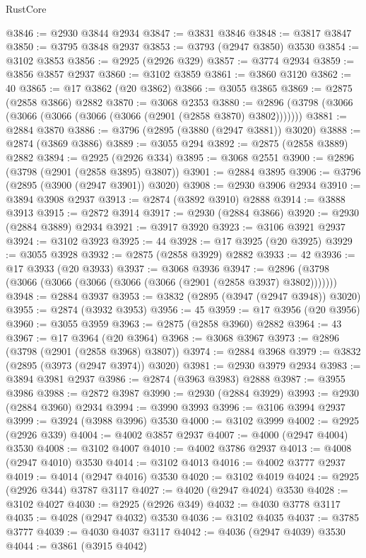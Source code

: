 \begin{lexlean}{RustCore}
\begin{coremodule}
@3846 := @2930 @3844 @2934
@3847 := @3831 @3846
@3848 := @3817 @3847
@3850 := @3795 @3848 @2937
@3853 := @3793 (@2947 @3850) @3530
@3854 := @3102 @3853
@3856 := @2925 (@2926 @329)
@3857 := @3774 @2934
@3859 := @3856 @3857 @2937
@3860 := @3102 @3859
@3861 := @3860 @3120
@3862 := 40
@3865 := @17 @3862 (@20 @3862)
@3866 := @3055 @3865
@3869 := @2875 (@2858 @3866) @2882
@3870 := @3068 @2353
@3880 := @2896 (@3798 (@3066 (@3066 (@3066 (@3066 (@3066 (@2901 (@2858 @3870) @3802)))))))
@3881 := @2884 @3870
@3886 := @3796 (@2895 (@3880 (@2947 @3881)) @3020)
@3888 := @2874 (@3869 @3886)
@3889 := @3055 @294
@3892 := @2875 (@2858 @3889) @2882
@3894 := @2925 (@2926 @334)
@3895 := @3068 @2551
@3900 := @2896 (@3798 (@2901 (@2858 @3895) @3807))
@3901 := @2884 @3895
@3906 := @3796 (@2895 (@3900 (@2947 @3901)) @3020)
@3908 := @2930 @3906 @2934
@3910 := @3894 @3908 @2937
@3913 := @2874 (@3892 @3910) @2888
@3914 := @3888 @3913
@3915 := @2872 @3914
@3917 := @2930 (@2884 @3866)
@3920 := @2930 (@2884 @3889) @2934
@3921 := @3917 @3920
@3923 := @3106 @3921 @2937
@3924 := @3102 @3923
@3925 := 44
@3928 := @17 @3925 (@20 @3925)
@3929 := @3055 @3928
@3932 := @2875 (@2858 @3929) @2882
@3933 := 42
@3936 := @17 @3933 (@20 @3933)
@3937 := @3068 @3936
@3947 := @2896 (@3798 (@3066 (@3066 (@3066 (@3066 (@3066 (@2901 (@2858 @3937) @3802)))))))
@3948 := @2884 @3937
@3953 := @3832 (@2895 (@3947 (@2947 @3948)) @3020)
@3955 := @2874 (@3932 @3953)
@3956 := 45
@3959 := @17 @3956 (@20 @3956)
@3960 := @3055 @3959
@3963 := @2875 (@2858 @3960) @2882
@3964 := 43
@3967 := @17 @3964 (@20 @3964)
@3968 := @3068 @3967
@3973 := @2896 (@3798 (@2901 (@2858 @3968) @3807))
@3974 := @2884 @3968
@3979 := @3832 (@2895 (@3973 (@2947 @3974)) @3020)
@3981 := @2930 @3979 @2934
@3983 := @3894 @3981 @2937
@3986 := @2874 (@3963 @3983) @2888
@3987 := @3955 @3986
@3988 := @2872 @3987
@3990 := @2930 (@2884 @3929)
@3993 := @2930 (@2884 @3960) @2934
@3994 := @3990 @3993
@3996 := @3106 @3994 @2937
@3999 := @3924 (@3988 @3996) @3530
@4000 := @3102 @3999
@4002 := @2925 (@2926 @339)
@4004 := @4002 @3857 @2937
@4007 := @4000 (@2947 @4004) @3530
@4008 := @3102 @4007
@4010 := @4002 @3786 @2937
@4013 := @4008 (@2947 @4010) @3530
@4014 := @3102 @4013
@4016 := @4002 @3777 @2937
@4019 := @4014 (@2947 @4016) @3530
@4020 := @3102 @4019
@4024 := @2925 (@2926 @344) @3787 @3117
@4027 := @4020 (@2947 @4024) @3530
@4028 := @3102 @4027
@4030 := @2925 (@2926 @349)
@4032 := @4030 @3778 @3117
@4035 := @4028 (@2947 @4032) @3530
@4036 := @3102 @4035
@4037 := @3785 @3777
@4039 := @4030 @4037 @3117
@4042 := @4036 (@2947 @4039) @3530
@4044 := @3861 (@3915 @4042)

\end{coremodule}
\end{lexlean}
